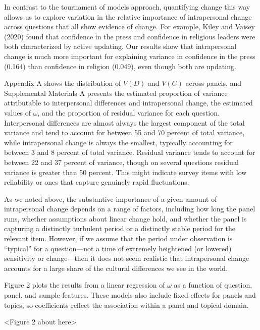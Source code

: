 \documentclass[
  12pt,
]{article}
\begin{document}
In contrast to the tournament of models approach, quantifying change
this way allows us to explore variation in the relative importance of
intrapersonal change across questions that all show evidence of change.
For example, Kiley and Vaisey (2020) found that confidence in the press
and confidence in religious leaders were both characterized by active
updating. Our results show that intrapersonal change is much more
important for explaining variance in confidence in the press (0.164)
than confidence in religion (0.049), even though both are updating.

Appendix A shows the distribution of \(V(D)\) and \(V(C)\) across
panels, and Supplemental Materials A presents the estimated proportion
of variance attributable to interpersonal differences and intrapersonal
change, the estimated values of \(\omega\), and the proportion of
residual variance for each question. Interpersonal differences are
almost always the largest component of the total variance and tend to
account for between 55 and 70 percent of total variance, while
intrapersonal change is always the smallest, typically accounting for
between 3 and 8 percent of total variance. Residual variance tends to
account for between 22 and 37 percent of variance, though on several
questions residual variance is greater than 50 percent. This might
indicate survey items with low reliability or ones that capture
genuinely rapid fluctuations.

As we noted above, the substantive importance of a given amount of
intrapersonal change depends on a range of factors, including how long
the panel runs, whether assumptions about linear change hold, and
whether the panel is capturing a distinctly turbulent period or a
distinctly stable period for the relevant item. However, if we assume
that the period under observation is ``typical'' for a question---not a
time of extremely heightened (or lowered) sensitivity or change---then
it does not seem realistic that intrapersonal change accounts for a
large share of the cultural differences we see in the world.

Figure 2 plots the results from a linear regression of \(\omega\) as a
function of question, panel, and sample features. These models also
include fixed effects for panels and topics, so coefficients reflect the
association within a panel and topical domain.

\begin{center}
<Figure 2 about here>
\end{center}
\end{document}

